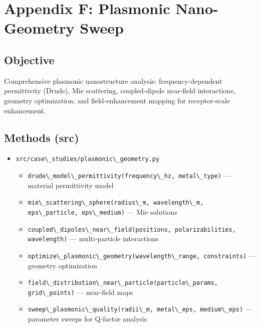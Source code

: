 \documentclass[
  13pt,
  a4paperpaper,
  12pt]{article}
\author{}
\date{}
\newcommand{\passthrough}[1]{#1}
\providecommand{\tightlist}{%
  \setlength{\itemsep}{0pt}\setlength{\parskip}{0pt}}
\let\oldsection\section
\renewcommand{\section}{\clearpage\oldsection}
\begin{document}
{
\hypersetup{linkcolor=black}
\setcounter{tocdepth}{3}
\tableofcontents
}
\section{Appendix F: Plasmonic Nano-Geometry
Sweep}\label{sec:app_plasmonic_geometry}

\subsection{Objective}\label{objective}

Comprehensive plasmonic nanostructure analysis: frequency-dependent
permittivity (Drude), Mie scattering, coupled‑dipole near‑field
interactions, geometry optimization, and field‑enhancement mapping for
receptor‑scale enhancement.

\subsection{Methods (src)}\label{methods-src}

\begin{itemize}
\tightlist
\item
  \passthrough{\lstinline!src/case\_studies/plasmonic\_geometry.py!}

  \begin{itemize}
  \tightlist
  \item
    \passthrough{\lstinline!drude\_model\_permittivity(frequency\_hz, metal\_type)!}
    --- material permittivity model
  \item
    \passthrough{\lstinline!mie\_scattering\_sphere(radius\_m, wavelength\_m, eps\_particle, eps\_medium)!}
    --- Mie solutions
  \item
    \passthrough{\lstinline!coupled\_dipoles\_near\_field(positions, polarizabilities, wavelength)!}
    --- multi‑particle interactions
  \item
    \passthrough{\lstinline!optimize\_plasmonic\_geometry(wavelength\_range, constraints)!}
    --- geometry optimization
  \item
    \passthrough{\lstinline!field\_distribution\_near\_particle(particle\_params, grid\_points)!}
    --- near‑field maps
  \item
    \passthrough{\lstinline!sweep\_plasmonic\_quality(radii\_m, metal\_eps, medium\_eps)!}
    --- parameter sweeps for Q‑factor analysis
  \end{itemize}
\end{itemize}
\end{document}
